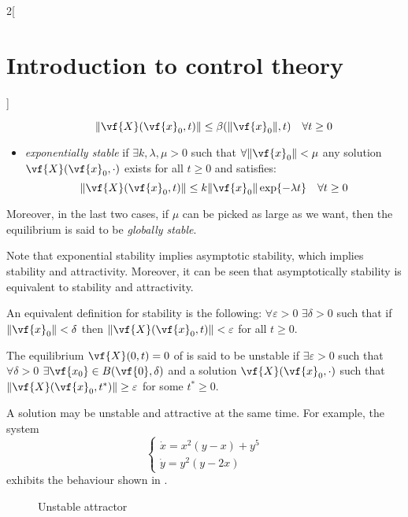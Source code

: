 \documentclass[../../../main_math.tex]{subfiles}
\begin{document}
\begin{multicols}{2}[\section{Introduction to control theory}]
\begin{definition}
\begin{itemize}
$$              \norm{\vf{X}(\vf{x}_0, t)}\leq \beta(\norm{\vf{x}_0}, t)\quad\forall t\geq 0
            $$
      \item \emph{exponentially stable} if $\exists k,\lambda,\mu>0$ such that $\forall\norm{\vf{x}_0}<\mu$ any solution $\vf{X}(\vf{x}_0, \cdot)$ exists for all $t\geq 0$ and satisfies:
            $$
              \norm{\vf{X}(\vf{x}_0, t)}\leq k\norm{\vf{x}_0} \exp{-\lambda t}\quad\forall t\geq 0
            $$
    \end{itemize}
    Moreover, in the last two cases, if $\mu$ can be picked as large as we want, then the equilibrium is said to be \emph{globally stable}.
  \end{definition}
  \begin{remark}
    Note that exponential stability implies asymptotic stability, which implies stability and attractivity. Moreover, it can be seen that asymptotically stability is equivalent to stability and attractivity.
  \end{remark}
  \begin{remark}
    An equivalent definition for stability is the following: $\forall \varepsilon>0$ $\exists \delta>0$ such that if $\norm{\vf{x}_0}<\delta$ then $\norm{\vf{X}(\vf{x}_0, t)}<\varepsilon$ for all $t\geq 0$.
  \end{remark}
  \begin{definition}
    The equilibrium $\vf{X}(0, t)=0$ of  is said to be unstable if $\exists \varepsilon>0$ such that $\forall \delta>0$ $\exists \vf{x_0}\in B(\vf{0},\delta)$ and a solution $\vf{X}(\vf{x}_0, \cdot)$ such that $\norm{\vf{X}(\vf{x}_0, t^*)}\geq \varepsilon$ for some $t^*\geq 0$.
  \end{definition}
  \begin{remark}
    A solution may be unstable and attractive at the same time. For example, the system
    $$
      \begin{cases}
        \dot{x} = x^2(y-x) + y^5 \\
        \dot{y} = y^2(y-2x)
      \end{cases}
    $$
    exhibits the behaviour shown in .
    \begin{figure}[H]
      \centering
      
      \caption{Unstable attractor}
      \label{ICT:unstable_attractor}
    \end{figure}
  \end{remark}
  \begin{definition}

\end{definition}
\end{multicols}
\end{document}
